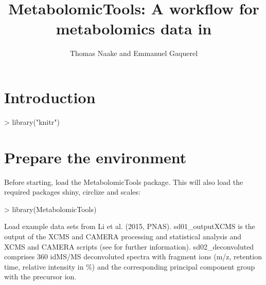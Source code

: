 \documentclass[11pt,a4paper,english,arial,twoside]{article}
\author[]{Thomas Naake and Emmanuel Gaquerel}
\affil{
    Plant Defense Metabolism \\
    Centre for Organismel Studies
}
\title{MetabolomicTools: A workflow for metabolomics data in \R}
\newcommand{\Rpackage}[1]{{\mbox{\normalfont\textsf{#1}}}}
\begin{document}


\maketitle

\section{Introduction}

\begin{Schunk}
\begin{Sinput}
> library("knitr")
\end{Sinput}
\end{Schunk}

\section{Prepare the environment}
Before starting, load the \Rpackage{MetabolomicTools} package. This will also
load the required packages \Rpackage{shiny}, \Rpackage{circlize} and 
\Rpackage{scales}: 
\begin{Schunk}
\begin{Sinput}
> library(MetabolomicTools)
\end{Sinput}
\end{Schunk}

Load example data sets from Li et al. (2015, PNAS). sd01\_outputXCMS is the 
output of the \Rpackage{XCMS} and \Rpackage{CAMERA} processing and statistical
analysis and \Rpackage{XCMS} and \Rpackage{CAMERA} scripts (see \citet{Li2015}
for further information). sd02\_deconvoluted comprises 360 idMS/MS 
deconvoluted spectra with fragment ions (m/z, retention time, relative
intensity in \%) and the corresponding principal component group with the 
precursor ion.
\end{document}
